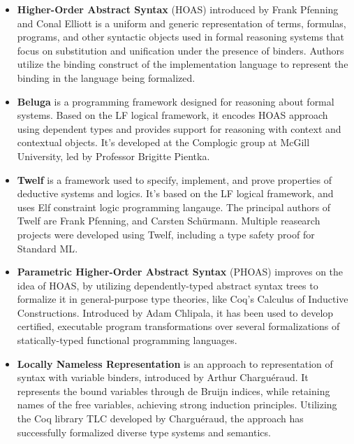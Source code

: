 \documentclass[english, mgr]{iithesis}
\begin{document}
\begin{itemize}
\item \textbf{Higher-Order Abstract Syntax} (HOAS) introduced by Frank Pfenning
and Conal Elliott\cite{hoas}
is a uniform and generic representation of terms, formulas, programs, and other
syntactic objects used in formal reasoning systems that focus on substitution and
unification under the presence of binders.
Authors utilize the binding construct of the implementation language to represent the binding in the language being formalized.
\\

\item \textbf{Beluga} is a programming framework designed for reasoning about formal systems.
Based on the LF logical framework, it encodes HOAS approach using dependent types
and provides support for reasoning with context and contextual objects.
It's developed at the Complogic group at McGill University, led by Professor Brigitte Pientka\cite{beluga}.
\\

\item \textbf{Twelf} is a framework used to specify, implement, and prove properties of deductive systems and logics.
It's based on the LF logical framework, and uses Elf constraint logic programming langauge.
The principal authors of Twelf are Frank Pfenning, and Carsten Schürmann\cite{twelf}.
Multiple reasearch projects were developed using Twelf, including a type safety proof for Standard ML\cite{twelf-ml}.
\\

\item \textbf{Parametric Higher-Order Abstract Syntax} (PHOAS) improves
on the idea of HOAS, by utilizing dependently-typed abstract syntax trees to
formalize it in general-purpose type theories, like Coq's Calculus of Inductive Constructions.
Introduced by Adam Chlipala\cite{phoas}, it has been used to develop certified, executable program transformations over several formalizations of statically-typed functional programming languages.
\\

\item \textbf{Locally Nameless Representation} is
an approach to representation of syntax with variable binders,
introduced by Arthur Charguéraud\cite{locally-nameless}.
It represents the bound variables through de Bruijn indices, while retaining
names of the free variables, achieving strong induction principles.
Utilizing the Coq library TLC developed by Charguéraud, the approach has successfully formalized diverse type systems and semantics.
\\


\end{itemize}
\end{document}
